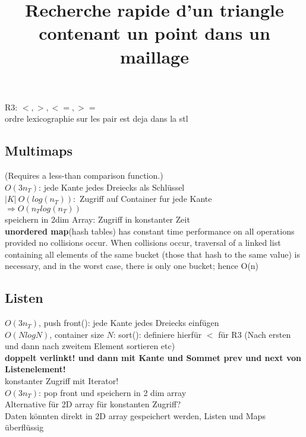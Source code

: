 \documentclass[10pt,a4paper]{article}
\begin{document}
	
\title{Recherche rapide d’un triangle contenant un point dans un maillage}

\section{}

R3: $<,>,<=,>=$\\
ordre lexicographie sur les pair est deja dans la stl

\subsection{Multimaps}
(Requires a less-than comparison function.)\\

$ O(3 n_T)$: jede Kante jedes Dreiecks als Schlüssel\\
$|K| \ O(log(n_T)):$ Zugriff auf Container fur jede Kante\\
$\Rightarrow O(n_T log(n_T))$\\
speichern in 2dim Array: Zugriff in konstanter Zeit\\

\textbf{unordered map}(hash tables) has constant time performance on all operations provided no collisions occur. When collisions occur, traversal of a linked list containing all elements of the same bucket (those that hash to the same value) is necessary, and in the worst case, there is only one bucket; hence O(n)\\

\subsection{Listen}

$ O(3 n_T)$, push front(): jede Kante jedes Dreiecks einfügen\\
$ O(N logN)$, container size $N$: sort(): definiere hierfür $<$ für R3 (Nach ersten und dann nach zweitem Element sortieren etc)\\

\textbf{doppelt verlinkt! und dann mit Kante und Sommet prev und next von Listenelement!}\\
konstanter Zugriff mit Iterator!\\

$ O(3 n_T)$: pop front und speichern in 2 dim array\\

Alternative für 2D array für konstanten Zugriff?\\
Daten könnten direkt in 2D array gespeichert werden, Listen und Maps überflüssig\\
\end{document}

